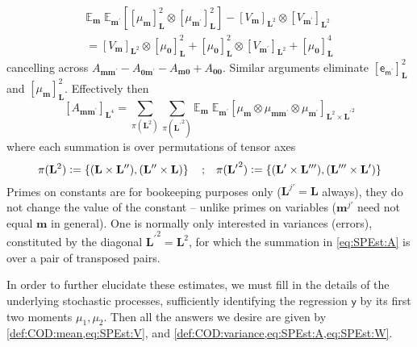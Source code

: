 \documentclass[preprint,12pt]{elsarticle}
\newcommand*{\M}[1]{\ensuremath{#1}\xspace}
\newcommand*{\x}{\times}
\newcommand*{\mi}[1]{\mathbf{#1}}
\newcommand*{\rv}[1]{\mathsf{#1}}
\newcommand*{\te}[2][]{\left\lbrack{#2}\right\rbrack_{#1}}
\newcommand*{\deq}{\M{\mathrel{\mathop:}=}}
\newcommand{\T}[1]{\text{#1}}
\newcommand*{\QT}[2][]{\M{\quad\T{#2}\ifthenelse{\equal{#1}{}}{\quad}{#1}}}
\newcommand*{\ev}[3][]{\mathbb{E}_{#3}^{#1}\!\left\lbrack{#2}\right\rbrack}
\newcommand*{\evt}[3][]{\mathbb{E}_{#3}^{#1}\!#2}
\newcommand*{\set}[1]{\M{\left\lbrace{#1}\right\rbrace}}
\begin{document}
    \begin{multline*}
        \evt{\;\ev{\te[\mi{L}]{\mu_{\mi{m}}}^{2} \otimes \te[\mi{L}]{\mu_{\mi{m^{\prime}}}}^{2}}{\mi{m^{\prime}}}}{\mi{m}}
        - \te[\mi{L}^2]{V_{\mi{m}}}\otimes \te[\mi{L}^2]{V_{\mi{m^{\prime}}}} \\
        = \te[\mi{L}^2]{V_{\mi{m}}}\otimes \te[\mi{L}]{\mu_{\mi{0}}}^{2}
        + \te[\mi{L}]{\mu_{\mi{0}}}^{2}\otimes \te[\mi{L}^2]{V_{\mi{m^{\prime}}}}
        + \te[\mi{L}]{\mu_{\mi{0}}}^{4}
    \end{multline*}
    cancelling across $A_{\mi{mm^{\prime}}}-A_{\mi{0m^{\prime}}} - A_{\mi{m0}}+A_{\mi{00}}$.
    Similar arguments eliminate $\te[\mi{L}]{\rv{e_{m^{\prime}}}}^{2}$ and $\te[\mi{L}]{\mu_{\mi{m}}}^{2}$.
    Effectively then
    \begin{equation}\label{eq:SPEst:A}
        \te[\mi{L}^4]{A_{\mi{mm^{\prime}}}} = \sum_{\pi(\mi{L}^{2})} \sum_{\pi(\mi{L^{\prime}}^{2})}
        \evt{\;\evt{\te[\mi{L}^{2} \x \mi{L^{\prime}}^{2}]{\mu_{\mi{m}} \otimes \mu_{\mi{mm^{\prime}}} \otimes \mu_{\mi{m^{\prime}}}}}{\mi{m^{\prime}}}}{\mi{m}}
    \end{equation}
    where each summation is over permutations of tensor axes
    \begin{equation*}
        \pi(\mi{L}^{2}) \deq \set{(\mi{L}\x\mi{L^{\prime\prime}}), (\mi{L^{\prime\prime}}\x\mi{L})} \QT{;} \pi(\mi{L^{\prime}}^{2}) \deq \set{(\mi{L^{\prime}}\x\mi{L^{\prime\prime\prime}}), (\mi{L^{\prime\prime\prime}}\x\mi{L^{\prime}})}
    \end{equation*}
    Primes on constants are for bookeeping purposes only ($\mi{L}^{j\prime} = \mi{L}$ always), they do not change the value of the constant -- unlike primes on variables ($\mi{m}^{j\prime}$ need not equal $\mi{m}$ in general). One is normally only interested in variances (errors), constituted by the diagonal $\mi{L^{\prime}}^{2}=\mi{L}^{2}$, for which the summation in \cref{eq:SPEst:A} is over a pair of transposed pairs.

    In order to further elucidate these estimates, we must fill in the details of the underlying stochastic processes, sufficiently identifying the regression $\rv{y}$ by its first two moments $\mu_{1}, \mu_{2}$. Then all the answers we desire are given by \cref{def:COD:mean,eq:SPEst:V}, and \cref{def:COD:variance,eq:SPEst:A,eq:SPEst:W}.
\end{document}

